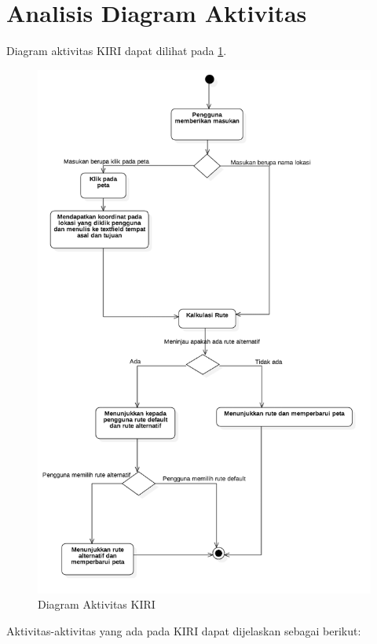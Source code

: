 \section{Analisis Diagram Aktivitas}
\label{sec:diagramaktivitas}
Diagram aktivitas KIRI dapat dilihat pada \ref{fig:3_activitydiagram}.

\begin{figure}[H]
	\centering
	\includegraphics[scale=0.5]{Gambar/activitydiagram}
	\caption{Diagram Aktivitas KIRI} 
	\label{fig:3_activitydiagram}
\end{figure}

Aktivitas-aktivitas yang ada pada KIRI dapat dijelaskan sebagai berikut:

